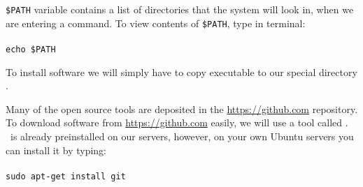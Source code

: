 \begin{framed}
\texttt{\$PATH} variable contains a list of directories that the system will look in, when we are
entering a command. To view contents of \texttt{\$PATH}, type in terminal:\\~\\
\texttt{echo \$PATH}\\
\end{framed}
To install software we will simply have to copy executable to our special directory \texttt{\binDir}.

Many of the open source tools are deposited in the \url{https://github.com} repository.
To download software from \url{https://github.com} easily, we will use a tool called \git.
\git~is already preinstalled on our servers, however, on your own Ubuntu servers
you can install it by typing:\\~\\
\texttt{sudo apt-get install git}\\





